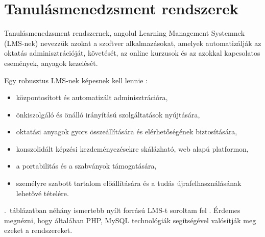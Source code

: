 \chapter{Tanulásmenedzsment rendszerek}
Tanulásmenedzsment rendszernek, angolul Learning Management Systemnek (LMS-nek) nevezzük azokat a szoftver alkalmazásokat, amelyek automatizálják az oktatás adminisztrációját, követését, az online kurzusok és az azokkal kapcsolatos események, anyagok kezelését.

Egy robusztus LMS-nek képesnek kell lennie \cite{link:ell}:
\begin{itemize}
\item központosított és automatizált adminisztrációra,
\item önkiszolgáló és önálló irányítású szolgáltatások nyújtására,
\item oktatási anyagok gyors összeállítására és elérhetőségének biztosítására,
\item konszolidált képzési kezdeményezésekre skálázható, web alapú platformon,
\item a portabilitás és a szabványok támogatására,
\item személyre szabott tartalom előállítására és a tudás újrafelhasználásának lehetővé tételére.
\end{itemize}

.~táblázatban néhány ismertebb nyílt forrású LMS-t soroltam fel \cite{link:lms}. Érdemes megnézni, hogy általában PHP, MySQL technológiák segítségével valósítják meg ezeket a rendszereket.



\begin{comment}


\bibitem[ell] {link:ell}
	Ellis, Ryann K. {\it A Field Guide to Learning Management Systems}, ASTD Learning Circuits, 2009 \\ \href{http://www.astd.org/NR/rdonlyres/12ECDB99-3B91-403E-9B15-7E597444645D/23395/LMS\_fieldguide\_20091.pdf}{http://www.astd.org/NR/rdonlyres/.../LMS\_fieldguide\_20091.pdf}

\bibitem[lms] {link:lms}
	Wikipedia, {\it List of learning management systems} \\ \href{http://en.wikipedia.org/wiki/List\_of\_learning\_management\_systems}{http://en.wikipedia.org/wiki/List\_of\_learning\_management\_systems}

\end{comment}
